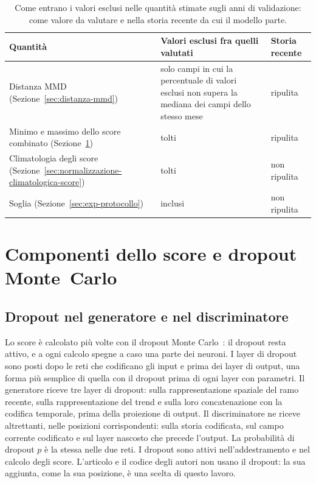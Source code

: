 \begin{table}[htbp]
    \centering
    \footnotesize
    \caption{Come entrano i valori esclusi nelle quantità stimate sugli anni di validazione: come valore da valutare e nella storia recente da cui il modello parte.}
    \label{tab:valori-esclusi}
    \vspace{0.6em}
    \begin{tabular}{@{}L{0.40}L{0.33}L{0.18}@{}}
        \toprule
        Quantità & Valori esclusi fra quelli valutati & Storia recente \\
        \midrule
        Distanza MMD (Sezione~\ref{sec:distanza-mmd}) & solo campi in cui la percentuale di valori esclusi non supera la mediana dei campi dello stesso mese & ripulita \\
        Minimo e massimo dello score combinato (Sezione~\ref{sec:score-dropout-montecarlo}) & tolti & ripulita \\
        Climatologia degli score (Sezione~\ref{sec:normalizzazione-climatologica-score}) & tolti & non ripulita \\
        Soglia (Sezione~\ref{sec:exp-protocollo}) & inclusi & non ripulita \\
        \bottomrule
    \end{tabular}
\end{table}

\section{Componenti dello score e dropout Monte~Carlo}
\label{sec:score-dropout-montecarlo}

\subsection{Dropout nel generatore e nel discriminatore}

Lo score è calcolato più volte con il dropout Monte Carlo~\cite{gal2016dropout}: il dropout resta attivo, e a ogni calcolo spegne a caso una parte dei neuroni. I layer di dropout sono posti dopo le reti che codificano gli input e prima dei layer di output, una forma più semplice di quella con il dropout prima di ogni layer con parametri. Il generatore riceve tre layer di dropout: sulla rappresentazione spaziale del ramo recente, sulla rappresentazione del trend e sulla loro concatenazione con la codifica temporale, prima della proiezione di output. Il discriminatore ne riceve altrettanti, nelle posizioni corrispondenti: sulla storia codificata, sul campo corrente codificato e sul layer nascosto che precede l'output. La probabilità di dropout $p$ è la stessa nelle due reti. I dropout sono attivi nell'addestramento e nel calcolo degli score. L'articolo e il codice degli autori non usano il dropout: la sua aggiunta, come la sua posizione, è una scelta di questo lavoro.

